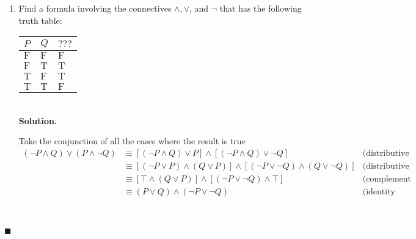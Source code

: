 \documentclass{report}
\newcommand{\sol}{\vspace{1em}\\\textbf{Solution.}\vspace{0.5em}}
\newcommand{\qed}{\ \\\strut\hfill$\blacksquare$\vspace{1em}}
\begin{document}
\begin{enumerate}[leftmargin=*]
    \item Find a formula involving the connectives $\wedge, \vee$, and $\neg$ that has
          the following truth table:
          \begin{center}
              \begin{tabular}{lll}
                  $P$                 & $Q$          & $? ? ?$      \\
                  \hline $\mathrm{F}$ & $\mathrm{F}$ & $\mathrm{F}$ \\
                  $\mathrm{F}$        & $\mathrm{T}$ & $\mathrm{T}$ \\
                  $\mathrm{T}$        & $\mathrm{F}$ & $\mathrm{T}$ \\
                  $\mathrm{T}$        & $\mathrm{T}$ & $\mathrm{F}$
              \end{tabular}
          \end{center}
          ‎\sol{}

          Take the conjunction of all the cases where the result is true
          \begin{align*}
              (\neg P \wedge Q) \vee (P \wedge \neg Q) & \equiv [(\neg P \wedge Q) \vee P] \wedge [(\neg P \wedge Q) \vee \neg Q]                        & \text{(distributive law)} \\
                                                       & \equiv [(\neg P \vee P) \wedge (Q \vee P)] \wedge [(\neg P \vee \neg Q) \wedge (Q \vee \neg Q)] & \text{(distributive law)} \\
                                                       & \equiv [\top \wedge (Q \vee P)] \wedge [(\neg P \vee \neg Q) \wedge \top]                       & \text{(complement law)}   \\
                                                       & \equiv (P \vee Q) \wedge (\neg P \vee \neg Q)                                                   & \text{(identity law)}
          \end{align*}
\end{enumerate}\qed
\end{document}

